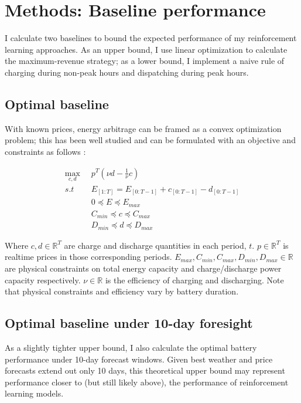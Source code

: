 \documentclass[conference]{IEEEtran}
\begin{document}
\section{Methods: Baseline performance}
I calculate two baselines to bound the expected performance of my reinforcement learning approaches. As an upper bound, I use linear optimization to calculate the maximum-revenue strategy; as a lower bound, I implement a naive rule of charging during non-peak hours and dispatching during peak hours. 

\subsection{Optimal baseline}
With known prices, energy arbitrage can be framed as a convex optimization problem; this has been well studied  and can be formulated with an objective and constraints as follows \cite{boyd}:

\begin{align*}
    \max_{c, d}\;\; & p^T(\nu d - \frac{1}{\nu}c)\\
    s.t\;\; & E_{[1:T]} = E_{[0:T-1]} + c_{[0:T-1]} - d_{[0:T-1]}\\
    & 0 \preceq E \preceq E_{max}\\
    & C_{min} \preceq c \preceq C_{max}\\
    & D_{min} \preceq d \preceq D_{max}
\end{align*}

Where $c, d \in \mathbb{R}^T$ are charge and discharge quantities in each period, $t$. $p \in \mathbb{R}^T$ is realtime prices in those corresponding periods. $E_{max}, C_{min}, C_{max}, D_{min}, D_{max} \in \mathbb{R}$ are physical constraints on total energy capacity and charge/discharge power capacity respectively. $\nu \in \mathbb{R}$ is the efficiency of charging and discharging. Note that physical constraints and efficiency vary by battery duration.

\subsection{Optimal baseline under 10-day foresight}
As a slightly tighter upper bound, I also calculate the optimal battery performance under 10-day forecast windows. Given best weather and price forecasts extend out only 10 days, this theoretical upper bound may represent performance closer to (but still likely above), the performance of reinforcement learning models.
\end{document}

